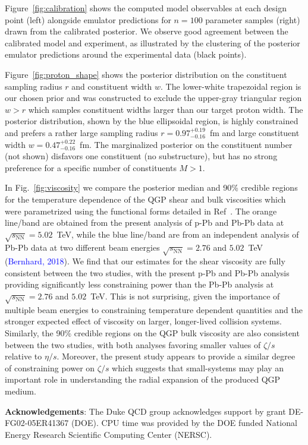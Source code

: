 \documentclass[3p,times,procedia,sort&compress]{elsarticle}
\newcommand{\sqrts}{\sqrt{s_\mathrm{NN}}}
\newcommand{\citetemp}[1]{(\textcolor{blue}{#1})}
\begin{document}
Figure~\ref{fig:calibration} shows the computed model observables at each design point (left) alongside emulator predictions for $n=100$ parameter samples (right) drawn from the calibrated posterior.
We observe good agreement between the calibrated model and experiment, as illustrated by the clustering of the posterior emulator predictions around the experimental data (black points).

Figure~\ref{fig:proton_shape} shows the posterior distribution on the constituent sampling radius $r$ and constituent width $w$.
The lower-white trapezoidal region is our chosen prior and was constructed to exclude the upper-gray triangular region $w > r$ which samples constituent widths larger than our target proton width.
The posterior distribution, shown by the blue ellipsoidal region, is highly constrained and prefers a rather large sampling radius $r=0.97_{-0.16}^{+0.19}$~fm and large constituent width $w=0.47_{-0.16}^{+0.22}$~fm.
The marginalized posterior on the constituent number (not shown) disfavors one constituent (no substructure), but has no strong preference for a specific number of constituents $M>1$.

In Fig.~\ref{fig:viscosity} we compare the posterior median and 90\% credible regions for the temperature dependence of the QGP shear and bulk viscosities which were parametrized using the functional forms detailed in Ref~\cite{Bass:2017zyn}.
The orange line/band are obtained from the present analysis of p-Pb and Pb-Pb data at $\sqrts=5.02$~TeV, while the blue line/band are from an independent analysis of Pb-Pb data at two different beam energies $\sqrts=2.76$ and $5.02$~TeV \citetemp{Bernhard, 2018}.
We find that our estimates for the shear viscosity are fully consistent between the two studies, with the present p-Pb and Pb-Pb analysis providing significantly less constraining power than the Pb-Pb analysis at $\sqrts=2.76$ and $5.02$~TeV.
This is not surprising, given the importance of multiple beam energies to constraining temperature dependent quantities and the stronger expected effect of viscosity on larger, longer-lived collision systems.
Similarly, the 90\% credible regions on the QGP bulk viscosity are also consistent between the two studies, with both analyses favoring smaller values of $\zeta/s$ relative to $\eta/s$.
Moreover, the present study appears to provide a similar degree of constraining power on $\zeta/s$ which suggests that small-systems may play an important role in understanding the radial expansion of the produced QGP medium.

\vspace{.5em}\noindent\textbf{Acknowledgements}:
The Duke QCD group acknowledges support by grant DE-FG02-05ER41367 (DOE).
CPU time was provided by the DOE funded National Energy Research Scientific Computing Center (NERSC).



\end{document}
